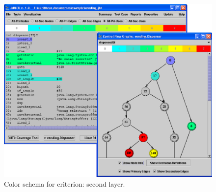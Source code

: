 \begin{figure}[!ht]
\begin{center}
\includegraphics[height=0.40\textheight]{fig/pri-uses-layer2.eps}
\caption{\label{fig:uses-color2} Color schema for
 criterion: second layer.}
\end{center}
\end{figure}
